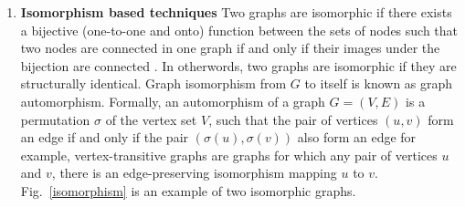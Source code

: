 \documentclass[10pt,a4paper]{article}
\theoremstyle{plain}
\theoremstyle{definition}
\begin{document}
     \begin{enumerate}
     	\item \textbf{Isomorphism based techniques}
     	 Two graphs are isomorphic if there exists a bijective (one-to-one and onto) function between the sets of nodes
     	such that two nodes are connected in one graph if and only if their images under the bijection are connected \citep{zager2008graph}. In otherwords, two graphs are isomorphic if they are structurally identical. Graph isomorphism from $G$ to itself is known as graph automorphism. Formally, an automorphism of a graph $G = (V,E)$ is a permutation $\sigma$ of the vertex set $V$, such that the pair of vertices $(u,v)$ form an edge if and only if the pair $(\sigma(u),\sigma(v))$ also form an edge for example, vertex-transitive graphs are graphs for which any pair of vertices $u$ and $v$, there is an edge-preserving isomorphism mapping $u$ to $v$. Fig.~\ref{isomorphism} is an example of two isomorphic graphs.
     	

\end{enumerate}
\end{document}
